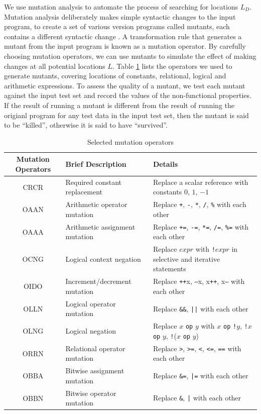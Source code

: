 We use mutation analysis to automate the process of searching for locations $L_D$. Mutation analysis deliberately makes simple syntactic changes to the input program, to create a set of various version programs called mutants, each contains a different syntactic change \cite{5487526}. A transformation rule that generates a mutant from the input program is known as a mutation operator. By carefully choosing mutation operators, we can use mutants to simulate the effect of making changes at all potential locations $L$. Table \ref{tab:cmop} lists the operators we used to generate mutants, covering locations of constants, relational, logical and arithmetic expressions. 
To assess the quality of a mutant, we test each mutant against the input test set and record the values of the non-functional properties. If the result of running a mutant is different from the result of running the origianl program for any test data in the input test set, then the mutant is said to be ``killed'', otherwise it is said to have ``survived''. 

\begin{table} [ht]
\caption{Selected mutation operators}
\label{tab:cmop} 
\begin{center}
\begin{tabular}{ | c | l | l |}
  \hline
  Mutation Operators & Brief Description & Details \\ 
\hline
  CRCR & Required constant replacement & Replace a scalar reference with constants $0$, $1$, $-1$ \\
  OAAN & Arithmetic operator mutation & Replace \texttt{+}, \texttt{-}, \texttt{*}, \texttt{/}, \texttt{\%} with each other \\
  OAAA & Arithmetic assignment mutation & Replace \texttt{+=}, \texttt{-=}, \texttt{*=}, \texttt{/=}, \texttt{\%=} with each other \\
  OCNG & Logical context negation & Replace $expr$ with \texttt{!}$expr$ in selective and iterative statements\\
  OIDO & Increment/decrement mutation  & Replace \texttt{++}x, \texttt{--}x, x\texttt{++}, x\texttt{--} with each other \\
  OLLN & Logical operator mutation  & Replace \texttt{\&\&}, \texttt{||} with each other \\ 
  OLNG & Logical negation & Replace $x$ \texttt{op} $y$ with $x$ \texttt{op} \texttt{!}$y$, \texttt{!}$x$ \texttt{op} $y$, \texttt{!}($x$ \texttt{op} $y$)\\
  ORRN & Relational operator mutation & Replace \texttt{>}, \texttt{>=}, \texttt{<}, \texttt{<=}, \texttt{==} with each other \\
  OBBA & Bitwise assignment mutation & Replace \texttt{\&=}, \texttt{|=} with each other \\
  OBBN & Bitwise operator mutation & Replace \texttt{\&}, \texttt{|} with each other \\
\hline
\end{tabular} 
\end{center} 
\end{table} 

